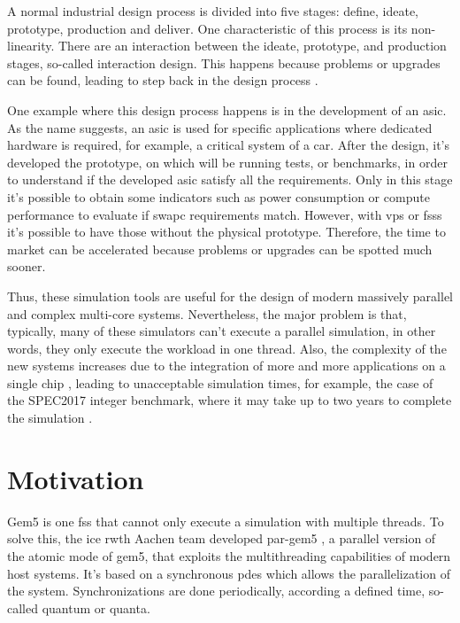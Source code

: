 
A normal industrial design process is divided into five stages: define, ideate, prototype, production and deliver. One characteristic of this process is its non-linearity. There are an interaction between the ideate, prototype, and production stages, so-called interaction design. This happens because problems or upgrades can be found, leading to step back in the design process \cite{ProductDesignSteps}.

One example where this design process happens is in the development of an \gls{asic}. As the name suggests, an \gls{asic} is used for specific applications where dedicated hardware is required, for example, a critical system of a car. After the design, it's developed the prototype, on which will be running tests, or benchmarks, in order to understand if the developed \gls{asic} satisfy all the requirements. Only in this stage it's possible to obtain some indicators such as power consumption or compute performance to evaluate if \gls{swapc} requirements match. However, with \glspl{vp} or \glspl{fss} it's possible to have those without the physical prototype. Therefore, the time to market can be accelerated because problems or upgrades can be spotted much sooner.

Thus, these simulation tools are useful for the design of modern massively parallel and complex multi-core systems. Nevertheless, the major problem is that, typically, many of these simulators can't execute a parallel simulation, in other words, they only execute the workload in one thread. Also, the complexity of the new systems increases due to the integration of more and more applications on a single chip \cite{terascaleComputing}, leading to unacceptable simulation times, for example, the case of the SPEC2017 integer benchmark, where it may take up to two years to complete the simulation \cite{pargem5}.

\section{Motivation}

Gem5 is one \gls{fss} that cannot only execute a simulation with multiple threads. To solve this, the \gls{ice} \gls{rwth} Aachen team developed par-gem5 \cite{pargem5}, a parallel version of the atomic mode of gem5, that exploits the multithreading capabilities of modern host systems. It’s based on a synchronous \gls{pdes} which allows the parallelization of the system. Synchronizations are done periodically, according a defined time, so-called quantum or quanta.

